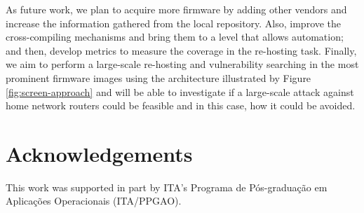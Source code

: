\documentclass[12pt]{article}
\begin{document}
As future work, we plan to acquire more firmware by adding other vendors and increase the information gathered from the local repository.  Also, improve the cross-compiling mechanisms and bring them to a level that allows automation; and then, develop metrics to measure the coverage in the re-hosting task. Finally, we aim to perform a large-scale re-hosting and vulnerability searching in the most prominent firmware images using the architecture illustrated by Figure \ref{fig:screen-approach} and will be able to investigate if a large-scale attack against home network routers could be feasible and in this case, how it could be avoided.


\section*{Acknowledgements}

This work was supported in part by ITA's Programa de Pós-graduação em Aplicações Operacionais (ITA/PPGAO).



\end{document}

